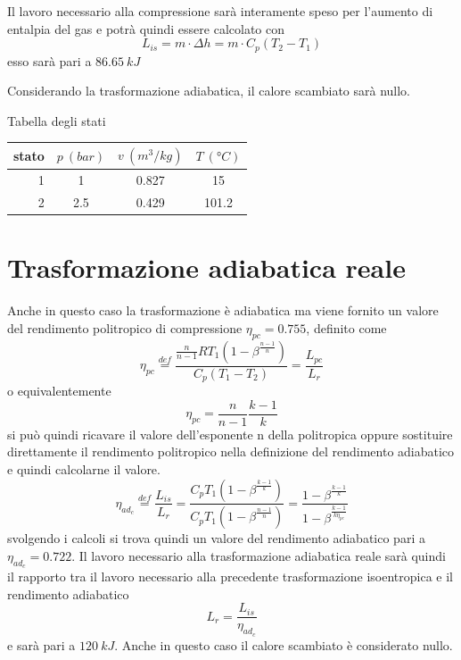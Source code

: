 \documentclass[a4paper,12pt]{article}
\begin{document}
Il lavoro necessario alla compressione sarà interamente speso per l'aumento di entalpia del gas
e potrà quindi essere calcolato con
\begin{equation}
    \label{eq:lavoro_isoentropico}
    L_{is} = m\cdot \Delta h = m\cdot C_p (T_2 - T_1)
\end{equation}
esso sarà pari a $86.65\ kJ$

Considerando la trasformazione adiabatica, il calore scambiato sarà nullo.

Tabella degli stati

\begin{center}
    \begin{tabular}{r|c|c|c}
        stato    & $p\ (bar)$ & $v\ (m^3/kg)$ & $T\ (\text{°}C) $\\ \hline
        1   &           1 &          0.827    &           15     \\ \hline
        2   &         2.5 &          0.429    &           101.2
    \end{tabular}
\end{center}

\section{Trasformazione adiabatica reale}
\label{sec:seconda_trasformazione}
Anche in questo caso la trasformazione è adiabatica ma viene fornito un valore del rendimento
politropico di compressione $\eta_{pc} = 0.755$, definito come
\begin{equation}
    \label{eq:rendimento_politropica}
    \eta_{pc} \stackrel{def}{=} \frac{\displaystyle\frac{n}{n-1} R T_1 \left(1-\beta^{\displaystyle\frac{n-1}{n}} \right)}{C_p \left(T_1 - T_2\right)}
    = \frac{L_{pc}}{L_r}
\end{equation}
o equivalentemente 
\begin{equation}
    \label{eq:rendimento_politropica_breve}
    \eta_{pc} = \frac{n}{n-1} \frac{k-1}{k}
\end{equation}
si può quindi ricavare il valore dell'esponente n della politropica oppure sostituire direttamente
il rendimento politropico nella definizione del rendimento adiabatico e quindi calcolarne il valore.
\begin{equation}
    \label{eq:rendimento_compressione_adiabatico}
    \eta_{ad_c} \stackrel{def}{=} \frac{L_{is}}{L_r} = \frac{ C_p T_1 \left(1-\beta^{\displaystyle\frac{k-1}{k}}\right)}
    {C_p T_1 \left(1-\beta^{\displaystyle\frac{n-1}{n}}\right)} = \frac{1-\beta^{\displaystyle\frac{k-1}{k}}}{1-\beta^{\displaystyle\frac{k-1}{k\eta_{pc}}}}
\end{equation}
svolgendo i calcoli si trova quindi un valore del rendimento adiabatico pari a $\eta_{ad_c}=0.722$.
Il lavoro necessario alla trasformazione adiabatica reale sarà quindi il rapporto tra il lavoro necessario
alla precedente trasformazione isoentropica e il rendimento adiabatico
\begin{equation*}
    L_r = \frac{L_{is}}{\eta_{ad_c}}
\end{equation*}
e sarà pari a $120\ kJ$.
Anche in questo caso il calore scambiato è considerato nullo.
\end{document}
